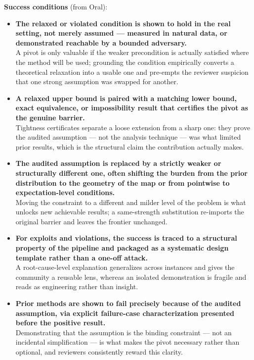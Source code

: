 \begin{tcolorbox}
\begin{enumerate}[leftmargin=14pt,topsep=2pt,itemsep=1pt]
\end{enumerate}
\textbf{Success conditions} (from Oral):
\begin{itemize}[leftmargin=12pt,topsep=2pt,itemsep=2pt]
  \item \textbf{The relaxed or violated condition is shown to hold in the real setting, not merely assumed --- measured in natural data, or demonstrated reachable by a bounded adversary.} \\ A pivot is only valuable if the weaker precondition is actually satisfied where the method will be used; grounding the condition empirically converts a theoretical relaxation into a usable one and pre-empts the reviewer suspicion that one strong assumption was swapped for another.
  \item \textbf{A relaxed upper bound is paired with a matching lower bound, exact equivalence, or impossibility result that certifies the pivot as the genuine barrier.} \\ Tightness certificates separate a loose extension from a sharp one: they prove the audited assumption --- not the analysis technique --- was what limited prior results, which is the structural claim the contribution actually makes.
  \item \textbf{The audited assumption is replaced by a strictly weaker or structurally different one, often shifting the burden from the prior distribution to the geometry of the map or from pointwise to expectation-level conditions.} \\ Moving the constraint to a different and milder level of the problem is what unlocks new achievable results; a same-strength substitution re-imports the original barrier and leaves the frontier unchanged.
  \item \textbf{For exploits and violations, the success is traced to a structural property of the pipeline and packaged as a systematic design template rather than a one-off attack.} \\ A root-cause-level explanation generalizes across instances and gives the community a reusable lens, whereas an isolated demonstration is fragile and reads as engineering rather than insight.
  \item \textbf{Prior methods are shown to fail precisely because of the audited assumption, via explicit failure-case characterization presented before the positive result.} \\ Demonstrating that the assumption is the binding constraint --- not an incidental simplification --- is what makes the pivot necessary rather than optional, and reviewers consistently reward this clarity.

\end{itemize}
\end{tcolorbox}
